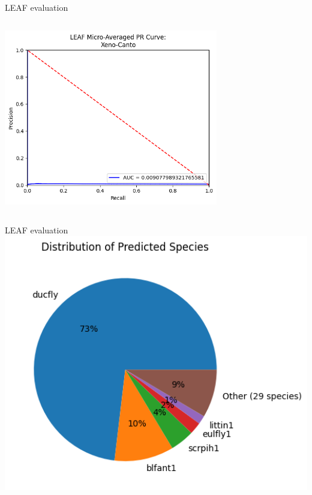 \begin{frame}{LEAF evaluation}
\begin{columns}
\begin{column}{0.5\textwidth}
            \break
            \centering
            \includegraphics[height=0.7\textheight,width=0.7\textwidth,keepaspectratio]{images/LEAF-PR-snd.png}
        \end{column}
    \end{columns}
\end{frame}

\begin{frame}{LEAF evaluation}
    \centering
    \includegraphics[height=1\textheight,width=1\textwidth,keepaspectratio]{images/species_prediction.png}
\end{frame}
